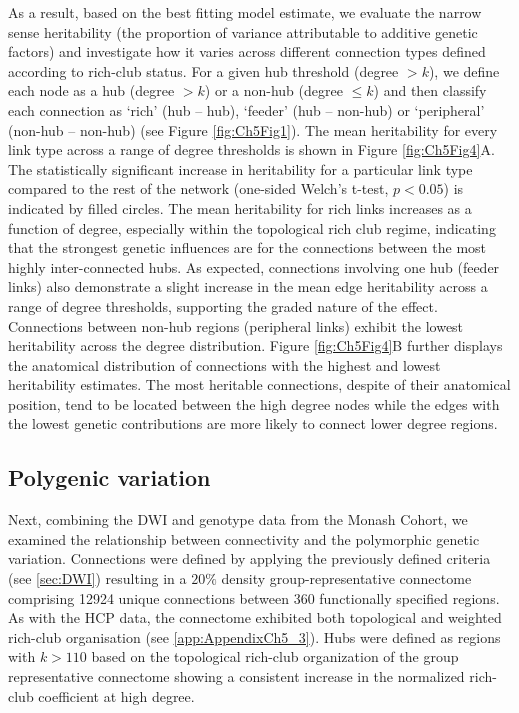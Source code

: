 As a result, based on the best fitting model estimate, we evaluate the narrow sense heritability (the proportion of variance attributable to additive genetic factors) and investigate how it varies across different connection types defined according to rich-club status. For a given hub threshold (degree $> k$), we define each node as a hub (degree $> k$) or a non-hub (degree $\leq k$) and then classify each connection as `rich' (hub – hub), `feeder' (hub – non-hub) or `peripheral' (non-hub – non-hub) (see Figure \ref{fig:Ch5Fig1}). The mean heritability for every link type across a range of degree thresholds is shown in Figure \ref{fig:Ch5Fig4}A. The statistically significant increase in heritability for a particular link type compared to the rest of the network (one-sided Welch’s t-test, $p < 0.05$) is indicated by filled circles. The mean heritability for rich links increases as a function of degree, especially within the topological rich club regime, indicating that the strongest genetic influences are for the connections between the most highly inter-connected hubs. As expected, connections involving one hub (feeder links) also demonstrate a slight increase in the mean edge heritability across a range of degree thresholds, supporting the graded nature of the effect. Connections between non-hub regions (peripheral links) exhibit the lowest heritability across the degree distribution. Figure \ref{fig:Ch5Fig4}B further displays the anatomical distribution of connections with the highest and lowest heritability estimates. The most heritable connections, despite of their anatomical position, tend to be located between the high degree nodes while the edges with the lowest genetic contributions are more likely to connect lower degree regions. 

\subsection{Polygenic variation}

Next, combining the DWI and genotype data from the Monash Cohort, we examined the relationship between connectivity and the polymorphic genetic variation. Connections were defined by applying the previously defined criteria (see \ref{sec:DWI}) resulting in a $20\%$ density group-representative connectome comprising \num{12924} unique connections between 360 functionally specified regions. As with the HCP data, the connectome exhibited both topological and weighted rich-club organisation (see \ref{app:AppendixCh5_3}). Hubs were defined as regions with $k > 110$ based on the topological rich-club organization of the group representative connectome showing a consistent increase in the normalized rich-club coefficient at high degree. 

